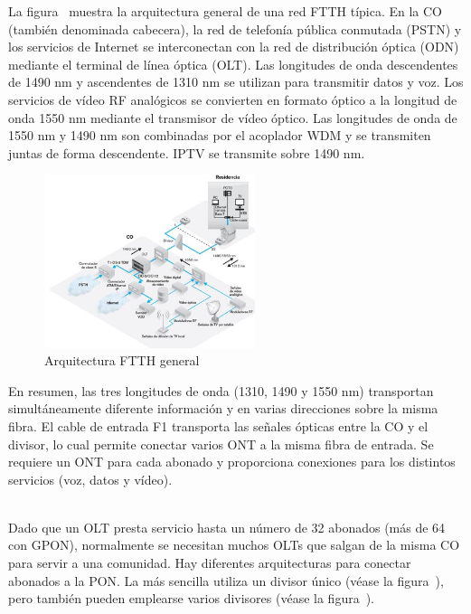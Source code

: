 La figura~ muestra la arquitectura general de una red FTTH típica. En la CO (también denominada cabecera), la red de telefonía pública conmutada (PSTN) y los servicios de Internet se interconectan con la red de distribución óptica (ODN) mediante el terminal de línea óptica (OLT). Las longitudes de onda descendentes de 1490 nm y ascendentes de 1310 nm se utilizan para transmitir datos y voz. Los servicios de vídeo RF analógicos se convierten en formato óptico a la longitud de onda 1550 nm mediante el transmisor de vídeo óptico. Las longitudes de onda de 1550 nm y 1490 nm son combinadas por el acoplador WDM y se transmiten juntas de forma descendente. IPTV se transmite sobre 1490 nm.



\begin{figure}
  \begin{center}
   	\includegraphics[width=0.55\textwidth]{./img/punto2/Arquitectura-FTTH-general.jpg}	
   	\caption{Arquitectura FTTH general}
	\label{fig:FTTH_general}
  \end{center}  
\end{figure}


En resumen, las tres longitudes de onda (1310, 1490 y 1550 nm) transportan simultáneamente diferente información y en varias direcciones sobre la misma fibra. El cable de entrada F1 transporta las señales ópticas entre la CO y el divisor, lo cual permite conectar varios ONT a la misma fibra de entrada. Se requiere un ONT para cada abonado y proporciona conexiones para los distintos servicios (voz, datos y vídeo).\\ \\


\vspace{1cm}


Dado que un OLT presta servicio hasta un número de 32 abonados (más de 64 con GPON), normalmente se necesitan muchos OLTs que salgan de la misma CO para servir a una comunidad. Hay diferentes arquitecturas para conectar abonados a la PON. La más sencilla utiliza un divisor único (véase la figura~), pero también pueden emplearse varios divisores (véase la figura~).


